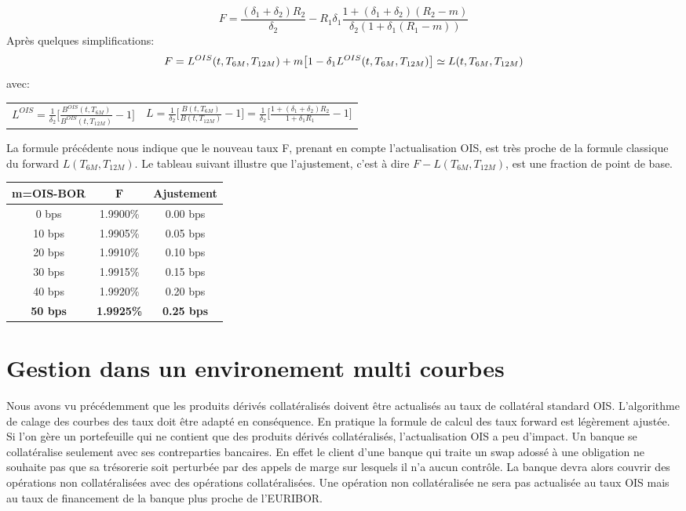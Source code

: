 \documentclass{article}
\begin{document}
\[
F=\frac{(\delta_1+\delta_2) R_2}{\delta_2}-R_1 \delta_1 \frac{1+(\delta_1+\delta_2) (R_2-m)}{\delta_2 (1+\delta_1 (R_1-m))}
\]
Après quelques simplifications:\\
\[
F=L^{OIS}(t,T_{6M},T_{12M})+m \big[ 1 - \delta_1 L^{OIS}(t,T_{6M},T_{12M}) \big] \simeq L(t,T_{6M},T_{12M}) \\
\]
avec:\\
\begin{center}
\begin{tabular}{c c}
$L^{OIS}=\frac{1}{\delta_2}\big[ \frac{B^{OIS}(t,T_{6M})}{B^{OIS}(t,T_{12M})}-1 \big]$&
$L=\frac{1}{\delta_2}\big[ \frac{B(t,T_{6M})}{B(t,T_{12M})}-1 \big]=\frac{1}{\delta_2}\big[\frac{1+(\delta_1+\delta_2) R_2}{1+\delta_1 R_1}-1\big]$\\
\end{tabular}
\end{center}
La formule précédente nous indique que le nouveau taux F, prenant en compte l'actualisation OIS, est très proche de la formule classique du forward $L(T_{6M},T_{12M})$. Le tableau suivant illustre que l'ajustement, c'est à dire $F-L(T_{6M},T_{12M})$, est une fraction de point de base.
\begin{center}
\begin{tabular}{|c|c|c|}  
\hline  
\textbf{m=OIS-BOR} & $\textbf{F}$ & \textbf{Ajustement} \\ 
\hline  
0 bps & 1.9900\%&0.00 bps\\ 
10 bps & 1.9905\%&0.05 bps\\ 
20 bps & 1.9910\%&0.10 bps\\ 
30 bps & 1.9915\%&0.15 bps\\ 
40 bps & 1.9920\%&0.20 bps\\ 
\textbf{\color{red}50 bps} & \textbf{\color{red}1.9925\%}&\textbf{\color{red}0.25 bps}\\ 
\hline 
\end{tabular}
\end{center}
\section*{Gestion dans un environement multi courbes}

Nous avons vu précédemment que les produits dérivés collatéralisés doivent être actualisés au taux de collatéral standard OIS. L'algorithme de calage des courbes des taux doit être adapté en conséquence. En pratique la formule de calcul des taux forward est légèrement ajustée. Si l'on gère un portefeuille qui ne contient que des produits dérivés collatéralisés, l'actualisation OIS a peu d'impact. Un banque se collatéralise seulement avec ses contreparties bancaires. En effet le client d'une banque qui traite un swap adossé à une obligation ne souhaite pas que sa trésorerie soit perturbée par des appels de marge sur lesquels il n'a aucun contrôle. La banque devra alors couvrir des opérations non collatéralisées avec des opérations collatéralisées. Une opération non collatéralisée ne sera pas actualisée au taux OIS mais au taux de financement de la banque plus proche de l'EURIBOR.\\
\end{document}
